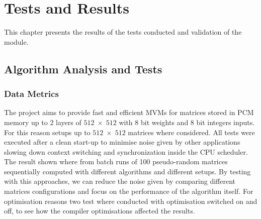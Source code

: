 \chapter{Tests and Results}\label{chap:test}
This chapter presents the results of the tests conducted and validation of the module.
\section{Algorithm Analysis and Tests}\label{sec:alg_anal}
\subsection{Data Metrics}\label{sec:bench}
The project aims to provide fast and efficient MVMs for matrices stored in PCM memory up to 2 layers of $512\;\times\;512$ with $8$ bit weights and $8$ bit integers inputs.
For this reason setups up to $512\;\times\;512$ matrices where considered.
All tests were executed after a clean start-up to minimise noise given by other applications slowing down context switching and synchronization inside the CPU scheduler.
The result shown where from batch runs of 100 pseudo-random matrices sequentially computed with different algorithms and different setups.
By testing with this approaches, we can reduce the noise given by comparing different matrices configurations and focus on the performance of the algorithm itself.
For optimisation reasons two test where conducted with optimisation switched on and off, to see how the compiler optimisations affected the results.
